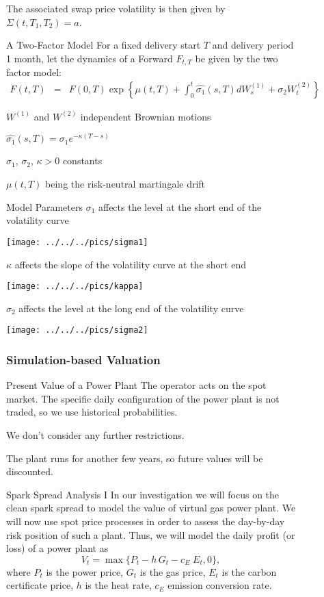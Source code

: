 \begin{figure}[htp]
	The associated swap price volatility is then given by $\Sigma(t,T_{1},T_{2})=a$.

  
A Two-Factor Model 
	For a fixed delivery start $T$ and delivery period 1 month, let
	the dynamics of a Forward $F_{t,T}$ be given by the two factor model:
		\begin{eqnarray*}
		F(t,T) & = & F(0,T)\exp\left\{ \mu(t,T)+\int_{0}^{t}\hat{\sigma_{1}}(s,T)dW_{s}^{(1)}+\sigma_{2}W_{t}^{(2)}\right\} 
		\end{eqnarray*}

	$W^{(1)}$ and $W^{(2)}$ independent Brownian motions 

	$\hat{\sigma_{1}}(s,T)=\sigma_{1}e^{-\kappa(T-s)}$ 

	$\sigma_{1}$, $\sigma_{2}$, $\kappa>0$ constants 

	$\mu(t,T)$ being the risk-neutral martingale drift 


Model Parameters
$\sigma_{1}$ affects the level at the short end of the volatility curve
	\begin{center}
	\texttt{[image: ../../../pics/sigma1]}
	\par\end{center}

 $\kappa$ affects the slope of the volatility curve at the short end
		\begin{center}
		\texttt{[image: ../../../pics/kappa]}
		\end{center}

 $\sigma_{2}$ affects the level at the long end of the volatility curve
	\begin{center}
	\texttt{[image: ../../../pics/sigma2]}
	\par\end{center}


\subsubsection{Simulation-based Valuation}

Present Value of a Power Plant 
	The operator acts on the spot market. The specific daily configuration
	of the power plant is not traded, so we use historical probabilities. 

	We don't consider any further restrictions. 

	The plant runs for another few years, so future values will be discounted. 


Spark Spread Analysis I
	In our investigation we will focus on the clean spark spread to model
	the value of virtual gas power plant. We will now use spot price processes
	in order to assess the day-by-day risk position of such a plant. Thus,
	we will model the daily profit (or loss) of a power plant as
		\begin{equation}
		V_{t}=\max\{P_{t}-h\, G_{t}-c_{E}\; E_{t},0\},\label{spark_spread_value}
		\end{equation}
	where $P_{t}$ is the power price, $G_{t}$ is the gas price, $E_{t}$
	is the carbon certificate price, $h$ is the heat rate, $c_{E}$ emission
	conversion rate. 



\end{figure}
